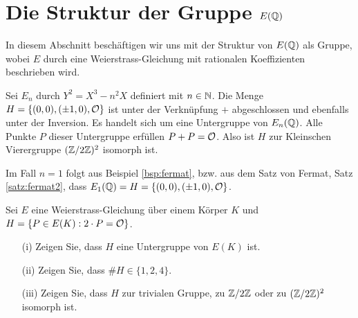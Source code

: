\section{Die Struktur der Gruppe $E({\mathbb{Q}})$}

In diesem Abschnitt beschäftigen wir uns mit der 
Struktur von $E({\mathbb{Q}})$ als Gruppe, wobei $E$ durch eine Weierstrass-Gleichung mit
rationalen Koeffizienten beschrieben wird. 


\begin{beispiel}
  \label{bsp:vierergruppe}
  Sei $E_n$ durch $Y^2 = X^3-n^2 X$ definiert mit $n\in{\mathbb{N}}$.
  Die Menge $H=\{(0,0),(\pm 1,0),{\mathcal O}\}$ ist unter der Verknüpfung $+$
  abgeschlossen
  und ebenfalls unter der Inversion.
  Es handelt sich um eine Untergruppe von $E_n({\mathbb{Q}})$.
  Alle
  Punkte $P$ dieser Untergruppe erfüllen $P+P={\mathcal O}$.  Also ist $H$ zur
  Kleinschen Vierergruppe $({\mathbb{Z}}/2{\mathbb{Z}})^2$ isomorph ist.
  
  Im Fall $n=1$ folgt aus Beispiel \ref{bsp:fermat}, bzw. aus dem Satz von Fermat, Satz
  \ref{satz:fermat2}, dass $E_1({\mathbb{Q}}) = H=  \{(0,0),(\pm 1,0),{\mathcal O}\}$. 
\end{beispiel}

\begin{aufgabe}
  Sei $E$ eine Weierstrass-Gleichung über einem Körper $K$ und
  $H = \{P \in E(K) : 2\cdot P={\mathcal O}\}$.
  \begin{enumerate}
  \item [(i)]
    Zeigen
    Sie, dass $H$ eine Untergruppe von $E(K)$ ist. 
  \item[(ii)] Zeigen Sie, dass $\# H \in \{1,2,4\}$.
  \item [(iii)] Zeigen Sie, dass $H$ zur trivialen Gruppe, zu
    ${\mathbb{Z}}/2{\mathbb{Z}}$ oder zu $({\mathbb{Z}}/2{\mathbb{Z}})^2$ isomorph ist. 
  \end{enumerate}
\end{aufgabe}

